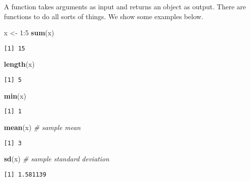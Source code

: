 \documentclass[]{book}
\newenvironment{Shaded}{\begin{snugshade}}{\end{snugshade}}
\newcommand{\KeywordTok}[1]{\textcolor[rgb]{0.13,0.29,0.53}{\textbf{{#1}}}}
\newcommand{\DecValTok}[1]{\textcolor[rgb]{0.00,0.00,0.81}{{#1}}}
\newcommand{\StringTok}[1]{\textcolor[rgb]{0.31,0.60,0.02}{{#1}}}
\newcommand{\CommentTok}[1]{\textcolor[rgb]{0.56,0.35,0.01}{\textit{{#1}}}}
\newcommand{\NormalTok}[1]{{#1}}
\numberwithin{equation}{chapter}
\numberwithin{figure}{chapter}
\theoremstyle{plain}
\theoremstyle{definition}
\theoremstyle{remark}
\theoremstyle{definition}
\theoremstyle{definition}
\theoremstyle{remark}
\begin{document}
A function takes arguments as input and returns an object as output.
There are functions to do all sorts of things. We show some examples
below.

\begin{Shaded}
\begin{Highlighting}[]
\NormalTok{x <-}\StringTok{ }\DecValTok{1}\NormalTok{:}\DecValTok{5}
\KeywordTok{sum}\NormalTok{(x)}
\end{Highlighting}
\end{Shaded}

\begin{verbatim}
[1] 15
\end{verbatim}

\begin{Shaded}
\begin{Highlighting}[]
\KeywordTok{length}\NormalTok{(x)}
\end{Highlighting}
\end{Shaded}

\begin{verbatim}
[1] 5
\end{verbatim}

\begin{Shaded}
\begin{Highlighting}[]
\KeywordTok{min}\NormalTok{(x)}
\end{Highlighting}
\end{Shaded}

\begin{verbatim}
[1] 1
\end{verbatim}

\begin{Shaded}
\begin{Highlighting}[]
\KeywordTok{mean}\NormalTok{(x)      }\CommentTok{# sample mean}
\end{Highlighting}
\end{Shaded}

\begin{verbatim}
[1] 3
\end{verbatim}

\begin{Shaded}
\begin{Highlighting}[]
\KeywordTok{sd}\NormalTok{(x)        }\CommentTok{# sample standard deviation}
\end{Highlighting}
\end{Shaded}

\begin{verbatim}
[1] 1.581139
\end{verbatim}
\end{document}
